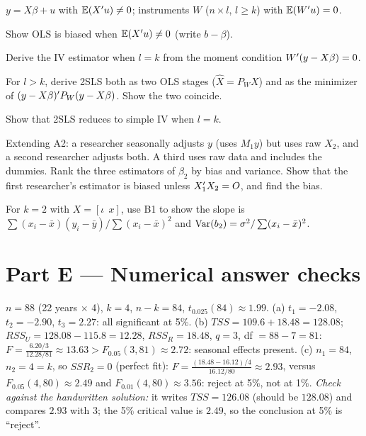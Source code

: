 \documentclass[11pt]{article}
\begin{document}
$y = X\beta + u$ with $\mathbb{E}(X^{\prime} u) \neq 0$; instruments $W$ ($n \times l$, $l \ge k$) with
$\mathbb{E}(W^{\prime} u) = 0$.
\begin{flatlist}
  \item[(a)] Show OLS is biased when $\mathbb{E}(X^{\prime} u) \neq 0$ (write $b - \beta$).
  \item[(b)] Derive the IV estimator when $l = k$ from the moment condition $W^{\prime}(y - X\beta) = 0$.
  \item[(c)] For $l > k$, derive 2SLS both as two OLS stages ($\hat X = P_{W}X$) and as the
        minimizer of $(y - X\beta)^{\prime} P_{W}(y - X\beta)$. Show the two coincide.
  \item[(d)] Show that 2SLS reduces to simple IV when $l = k$.
\end{flatlist}

Extending A2: a researcher seasonally adjusts $y$ (uses $M_{1}y$) but uses raw $X_{2}$, and
a second researcher adjusts both. A third uses raw data and includes the dummies. Rank the
three estimators of $\beta_{2}$ by bias and variance. Show that the first researcher's
estimator is biased unless $X_{1}^{\prime} X_{2} = O$, and find the bias.

For $k = 2$ with $X = [\iota\ \ x]$, use B1 to show the slope is
$\sum(x_{i} - \bar x)(y_{i} - \bar y)/\sum(x_{i} - \bar x)^{2}$ and
$\operatorname{Var}(b_{2}) = \sigma^{2}/\sum(x_{i} - \bar x)^{2}$.

\section{Part E --- Numerical answer checks}

 $n = 88$ (22 years $\times$ 4), $k = 4$, $n - k = 84$, $t_{0.025}(84) \approx 1.99$.
(a) $t_{1} = -2.08$, $t_{2} = -2.90$, $t_{3} = 2.27$: all significant at 5\%.
(b) $TSS = 109.6 + 18.48 = 128.08$; $RSS_{U} = 128.08 - 115.8 = 12.28$, $RSS_{R} = 18.48$,
$q = 3$, df $= 88 - 7 = 81$:
$F = \frac{6.20/3}{12.28/81} \approx 13.63 > F_{0.05}(3,81) \approx 2.72$: seasonal effects present.
(c) $n_{1} = 84$, $n_{2} = 4 = k$, so $SSR_{2} = 0$ (perfect fit):
$F = \frac{(18.48 - 16.12)/4}{16.12/80} \approx 2.93$, versus $F_{0.05}(4,80) \approx 2.49$
and $F_{0.01}(4,80) \approx 3.56$: reject at 5\%, not at 1\%.
\emph{Check against the handwritten solution:} it writes $TSS = 126.08$ (should be $128.08$) and compares
$2.93$ with $3$; the 5\% critical value is $2.49$, so the conclusion at 5\% is ``reject''.
\end{document}
